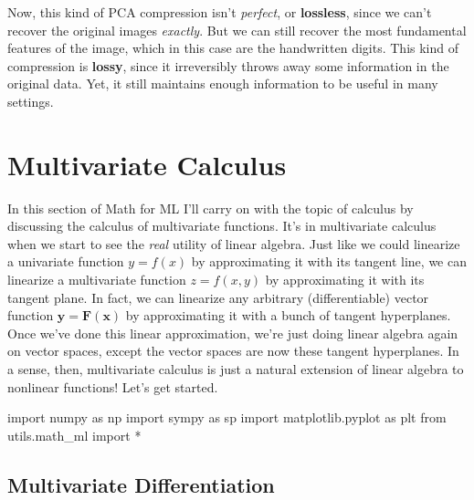 \documentclass[
  letterpaper,
  DIV=11,
  numbers=noendperiod]{scrreprt}
\newenvironment{Shaded}{\begin{snugshade}}{\end{snugshade}}
\newcommand{\ImportTok}[1]{\textcolor[rgb]{0.00,0.46,0.62}{#1}}
\newcommand{\NormalTok}[1]{\textcolor[rgb]{0.00,0.23,0.31}{#1}}
\newcommand{\OperatorTok}[1]{\textcolor[rgb]{0.37,0.37,0.37}{#1}}
\begin{document}
Now, this kind of PCA compression isn't \emph{perfect}, or
\textbf{lossless}, since we can't recover the original images
\emph{exactly}. But we can still recover the most fundamental features
of the image, which in this case are the handwritten digits. This kind
of compression is \textbf{lossy}, since it irreversibly throws away some
information in the original data. Yet, it still maintains enough
information to be useful in many settings.


\hypertarget{multivariate-calculus}{%
\chapter{Multivariate Calculus}\label{multivariate-calculus}}

In this section of Math for ML I'll carry on with the topic of calculus
by discussing the calculus of multivariate functions. It's in
multivariate calculus when we start to see the \emph{real} utility of
linear algebra. Just like we could linearize a univariate function
\(y=f(x)\) by approximating it with its tangent line, we can linearize a
multivariate function \(z=f(x,y)\) by approximating it with its tangent
plane. In fact, we can linearize any arbitrary (differentiable) vector
function \(\mathbf{y} = \mathbf{F}(\mathbf{x})\) by approximating it
with a bunch of tangent hyperplanes. Once we've done this linear
approximation, we're just doing linear algebra again on vector spaces,
except the vector spaces are now these tangent hyperplanes. In a sense,
then, multivariate calculus is just a natural extension of linear
algebra to nonlinear functions! Let's get started.

\begin{Shaded}
\begin{Highlighting}[]
\ImportTok{import}\NormalTok{ numpy }\ImportTok{as}\NormalTok{ np}
\ImportTok{import}\NormalTok{ sympy }\ImportTok{as}\NormalTok{ sp}
\ImportTok{import}\NormalTok{ matplotlib.pyplot }\ImportTok{as}\NormalTok{ plt}
\ImportTok{from}\NormalTok{ utils.math\_ml }\ImportTok{import} \OperatorTok{*}
\end{Highlighting}
\end{Shaded}

\hypertarget{multivariate-differentiation}{%
\section{Multivariate
Differentiation}\label{multivariate-differentiation}}
\end{document}
